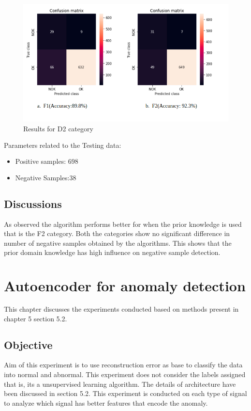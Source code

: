          \begin{figure}[b]
         	\centering
         	\includegraphics[width=.9\linewidth]{images/r2.png}
         	\caption{Results for D2 category}
         	\label{r2}
         \end{figure}
  Parameters related to the Testing  data:
  \begin{itemize}
  	\item Positive samples: 698
  	
  \item	Negative Samples:38
  	
  \end{itemize}
 
  \section{Discussions}      
  
  As observed the algorithm performs better for  when the prior knowledge is used that is the F2 category. Both the categories show no significant difference in number of negative samples obtained by the algorithms. This shows that the prior domain knowledge has high influence on negative sample detection. 

  \chapter{Autoencoder for anomaly detection}
  This chapter discusses the experiments conducted based on methods present in chapter 5 section 5.2. 
  \section{Objective}
  Aim of this experiment is to use reconstruction error as base to classify the data into normal and abnormal. This experiment does not consider the labels assigned that is, its a unsupervised learning algorithm. The details of architecture have been discussed in section 5.2. 
  This experiment is conducted on each type of signal to analyze which signal has better features that encode the anomaly.
  
